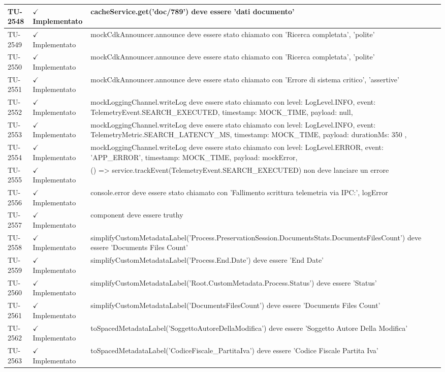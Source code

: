 ﻿\documentclass[a4paper,12pt]{article}
\newcommand{\ok}{\textcolor{green!60!black}{$\checkmark$ Implementato}}
\begin{document}
\begin{longtable}{|p{2cm}|p{3.5cm}|p{9.5cm}|}
\hline
TU-2548 & \ok & cacheService.get('doc/789') deve essere 'dati documento' \\
\hline
TU-2549 & \ok & mockCdkAnnouncer.announce deve essere stato chiamato con 'Ricerca completata', 'polite' \\
\hline
TU-2550 & \ok & mockCdkAnnouncer.announce deve essere stato chiamato con 'Ricerca completata', 'polite' \\
\hline
TU-2551 & \ok & mockCdkAnnouncer.announce deve essere stato chiamato con 'Errore di sistema critico', 'assertive' \\
\hline
TU-2552 & \ok & mockLoggingChannel.writeLog deve essere stato chiamato con { level: LogLevel.INFO, event: TelemetryEvent.SEARCH\_EXECUTED, timestamp: MOCK\_TIME, payload: null, } \\
\hline
TU-2553 & \ok & mockLoggingChannel.writeLog deve essere stato chiamato con { level: LogLevel.INFO, event: TelemetryMetric.SEARCH\_LATENCY\_MS, timestamp: MOCK\_TIME, payload: { durationMs: 350 }, } \\
\hline
TU-2554 & \ok & mockLoggingChannel.writeLog deve essere stato chiamato con { level: LogLevel.ERROR, event: 'APP\_ERROR', timestamp: MOCK\_TIME, payload: mockError, } \\
\hline
TU-2555 & \ok & () => service.trackEvent(TelemetryEvent.SEARCH\_EXECUTED) non deve lanciare un errore \\
\hline
TU-2556 & \ok & console.error deve essere stato chiamato con 'Fallimento scrittura telemetria via IPC:', logError \\
\hline
TU-2557 & \ok & component deve essere truthy \\
\hline
TU-2558 & \ok & simplifyCustomMetadataLabel('Process.PreservationSession.DocumentsStats.DocumentsFilesCount') deve essere 'Documents Files Count' \\
\hline
TU-2559 & \ok & simplifyCustomMetadataLabel('Process.End.Date') deve essere 'End Date' \\
\hline
TU-2560 & \ok & simplifyCustomMetadataLabel('Root.CustomMetadata.Process.Status') deve essere 'Status' \\
\hline
TU-2561 & \ok & simplifyCustomMetadataLabel('DocumentsFilesCount') deve essere 'Documents Files Count' \\
\hline
TU-2562 & \ok & toSpacedMetadataLabel('SoggettoAutoreDellaModifica') deve essere 'Soggetto Autore Della Modifica' \\
\hline
TU-2563 & \ok & toSpacedMetadataLabel('CodiceFiscale\_PartitaIva') deve essere 'Codice Fiscale Partita Iva' \\

\end{longtable}
\end{document}

